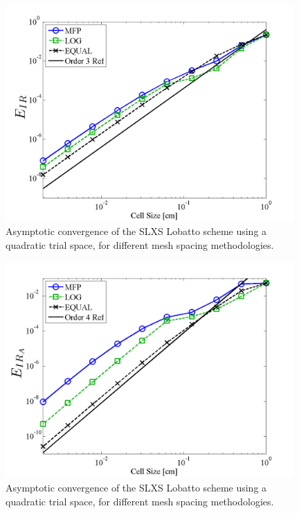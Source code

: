 %
%
\begin{figure}[!htp]
\centering
\includegraphics[width=11cm]{chapter3_variable_xs/P2_LOBATTO_E_IR.png}
\caption{Asymptotic convergence of the SLXS Lobatto scheme using a quadratic trial space, for different mesh spacing methodologies.}
\label{fig:lobatto_spacing_ir}
\end{figure}
%
%
\begin{figure}[!hbp]
\centering
\includegraphics[width=11cm]{chapter3_variable_xs/P2_LOBATTO_E_IR_A.png}
\caption{Asymptotic convergence of the SLXS Lobatto scheme using a quadratic trial space, for different mesh spacing methodologies.}
\label{fig:lobatto_spacing_ir_A}
\end{figure}
%
%

